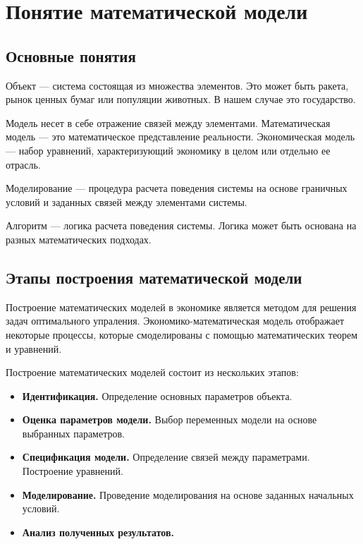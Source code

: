 \chapter{Понятие математической модели}
\label{cha:definition}

\section{Основные понятия}

Объект --- система состоящая из множества элементов.
Это может быть ракета, рынок ценных бумаг или популяции животных.
В нашем случае это государство.

Модель несет в себе отражение связей между элементами.
Математическая модель --- это математическое представление реальности.
Экономическая модель --- набор уравнений, характеризующий экономику в целом или отдельно ее отрасль.

Моделирование --- процедура расчета поведения системы на основе граничных условий и заданных связей между элементами системы.

Алгоритм --- логика расчета поведения системы.
Логика может быть основана на разных математических подходах.

\section{Этапы построения математической модели}

Построение математических моделей в экономике является методом для решения задач оптимального упраления.
Экономико-математическая модель отображает некоторые процессы, которые смоделированы с помощью математических теорем и уравнений.

Построение математических моделей состоит из нескольких этапов:
\begin{itemize}
	\item \textbf{Идентификация.}
	Определение основных параметров объекта.
	\item \textbf{Оценка параметров модели.}
	Выбор переменных модели на основе выбранных параметров.
	\item \textbf{Спецификация модели.}
	Определение связей между параметрами.
	Построение уравнений.
	\item \textbf{Моделирование.}
	Проведение моделирования на основе заданных начальных условий.
	\item \textbf{Анализ полученных результатов.}
\end{itemize}


